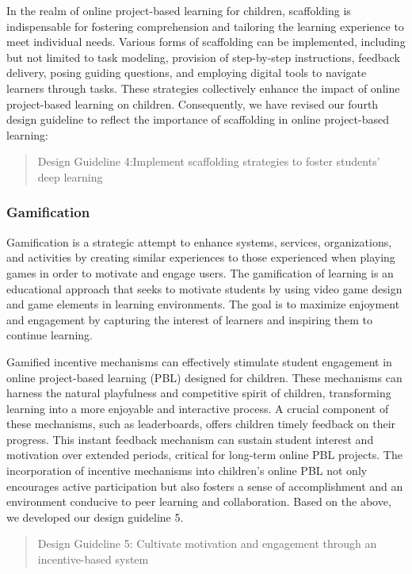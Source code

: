 In the realm of online project-based learning for children, scaffolding is indispensable for fostering comprehension and tailoring the learning experience to meet individual needs. Various forms of scaffolding can be implemented, including but not limited to task modeling, provision of step-by-step instructions, feedback delivery, posing guiding questions, and employing digital tools to navigate learners through tasks. These strategies collectively enhance the impact of online project-based learning on children. Consequently, we have revised our fourth design guideline to reflect the importance of scaffolding in online project-based learning:

 \begin{quote}
  Design Guideline 4:Implement scaffolding strategies to foster students' deep learning
\end{quote}

\subsubsection{Gamification}
Gamification is a strategic attempt to enhance systems, services, organizations, and activities by creating similar experiences to those experienced when playing games in order to motivate and engage users\citep{koivisto2019rise}. The gamification of learning is an educational approach that seeks to motivate students by using video game design and game elements in learning environments\citep{shatz2015using,sailer2017gamification}. The goal is to maximize enjoyment and engagement by capturing the interest of learners and inspiring them to continue learning\citep{huang2013gamification}.

Gamified incentive mechanisms can effectively stimulate student engagement in online project-based learning (PBL) designed for children. These mechanisms can harness the natural playfulness and competitive spirit of children, transforming learning into a more enjoyable and interactive process. A crucial component of these mechanisms, such as leaderboards, offers children timely feedback on their progress. This instant feedback mechanism can sustain student interest and motivation over extended periods, critical for long-term online PBL projects. The incorporation of incentive mechanisms into children's online PBL not only encourages active participation but also fosters a sense of accomplishment and an environment conducive to peer learning and collaboration. Based on the above, we developed our design guideline 5.

\begin{quote}
    Design Guideline 5: Cultivate motivation and engagement through an incentive-based system
\end{quote}